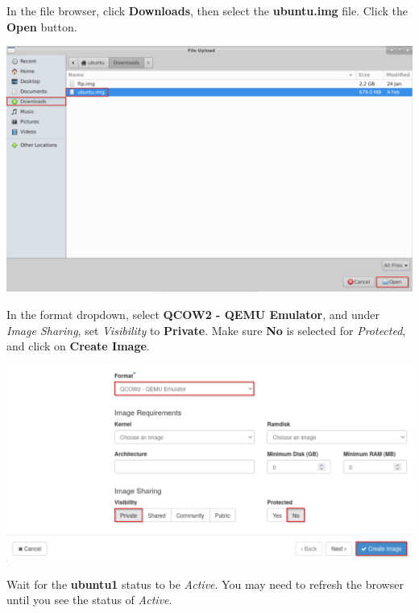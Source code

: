 \documentclass[letterpaper, 12pt]{article}
\begin{document}
\begin{enumerate}
    \begin{labstep}
        In the file browser, click \textbf{Downloads}, then select the \textbf{ubuntu.img} file.
        Click the \textbf{Open} button.

        \begin{center}
            \includegraphics[width=\linewidth]{images/part1/step7.png}
        \end{center}
    \end{labstep}

    \begin{labstep}
        In the format dropdown, select \textbf{QCOW2 - QEMU Emulator}, and under \textit{Image Sharing}, set \textit{Visibility} to \textbf{Private}. %
        Make sure \textbf{No} is selected for \textit{Protected}, and click on \textbf{Create Image}.

        \begin{center}
            \includegraphics[width=\linewidth]{images/part1/step8.png}
        \end{center}
    \end{labstep}

    \begin{stopbox}
        Wait for the \textbf{ubuntu1} status to be \textit{Active}.
        You may need to refresh the browser until you see the status of \textit{Active}.
    \end{stopbox}


\end{enumerate}
\end{document}
